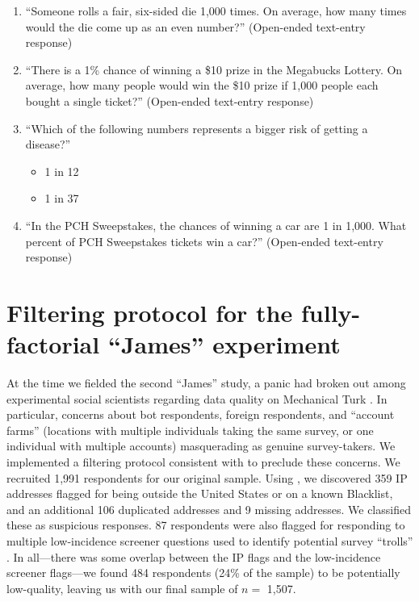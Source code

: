 \documentclass[12pt, letterpaper]{article}
\begin{document}
\begin{enumerate}
\item ``Someone rolls a fair, six-sided die 1,000 times. On average, how many times would the die come up as an even number?'' (Open-ended text-entry response)

\item ``There is a 1\% chance of winning a \$10 prize in the Megabucks Lottery. On average, how many people would win the \$10 prize if 1,000 people each bought a single ticket?'' (Open-ended text-entry response)

\item ``Which of the following numbers represents a bigger risk of getting a disease?'' 
    \begin{itemize}
    \item 1 in 12
    \item 1 in 37
    \end{itemize}
    
\item ``In the PCH Sweepstakes, the chances of winning a car are 1 in 1,000. What percent of PCH Sweepstakes tickets win a car?'' (Open-ended text-entry response)
\end{enumerate}

\clearpage

\section{Filtering protocol for the fully-factorial ``James'' experiment} \label{si:filtering}

At the time we fielded the second ``James'' study, a panic had broken out among experimental social scientists regarding data quality on Mechanical Turk \citep[e.g.,][]{ahler2019turk_nyu, bai_2018, ryan_2018}. In particular, concerns about bot respondents, foreign respondents, and ``account farms'' (locations with multiple individuals taking the same survey, or one individual with multiple accounts) masquerading as genuine survey-takers. We implemented a filtering protocol consistent with \citep{ahler2019turk_nyu} to preclude these concerns. We recruited 1,991 respondents for our original sample. Using \citet{kyip}, we discovered 359 IP addresses flagged for being outside the United States or on a known Blacklist, and an additional 106 duplicated addresses and 9 missing addresses. We classified these as suspicious responses. 87 respondents were also flagged for responding to multiple low-incidence screener questions used to identify potential survey ``trolls'' \citep{lopezhillygus_2018}. In all---there was some overlap between the IP flags and the low-incidence screener flags---we found 484 respondents (24\% of the sample) to be potentially low-quality, leaving us with our final sample of $n =$ 1,507. 
\end{document}
